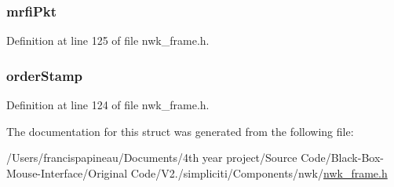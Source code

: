 \hypertarget{structframeInfo__t_ac7a6c4fea11f56eda913e5c5b1092aa5}{
\subsubsection[{mrfi\-Pkt}]{ {\bf mrfi\-Pkt}}}\label{structframeInfo__t_ac7a6c4fea11f56eda913e5c5b1092aa5}


\-Definition at line 125 of file nwk\-\_\-frame.\-h.

\hypertarget{structframeInfo__t_a67b3ffbf7c3dc9ca9c1b6399c3e478a1}{
\subsubsection[{order\-Stamp}]{ {\bf order\-Stamp}}}\label{structframeInfo__t_a67b3ffbf7c3dc9ca9c1b6399c3e478a1}


\-Definition at line 124 of file nwk\-\_\-frame.\-h.



\-The documentation for this struct was generated from the following file\-:\begin{DoxyCompactItemize}
\item 
/\-Users/francispapineau/\-Documents/4th year project/\-Source Code/\-Black-\/\-Box-\/\-Mouse-\/\-Interface/\-Original Code/\-V2./simpliciti/\-Components/nwk/\hyperlink{nwk__frame_8h}{nwk\-\_\-frame.\-h}\end{DoxyCompactItemize}
